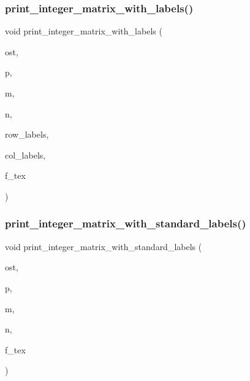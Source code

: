 \mbox{\label{util_8_c_a2bdc89ce87b4a61c848a4859d85c2f30}} 
\subsubsection{\texorpdfstring{print\+\_\+integer\+\_\+matrix\+\_\+with\+\_\+labels()}{print\_integer\_matrix\_with\_labels()}}
{\footnotesize\ttfamily void print\+\_\+integer\+\_\+matrix\+\_\+with\+\_\+labels (\begin{DoxyParamCaption}\item[{ostream \&}]{ost,  }\item[{\mbox{\hyperlink{galois_8h_a09fddde158a3a20bd2dcadb609de11dc}{I\+NT}} $\ast$}]{p,  }\item[{\mbox{\hyperlink{galois_8h_a09fddde158a3a20bd2dcadb609de11dc}{I\+NT}}}]{m,  }\item[{\mbox{\hyperlink{galois_8h_a09fddde158a3a20bd2dcadb609de11dc}{I\+NT}}}]{n,  }\item[{\mbox{\hyperlink{galois_8h_a09fddde158a3a20bd2dcadb609de11dc}{I\+NT}} $\ast$}]{row\+\_\+labels,  }\item[{\mbox{\hyperlink{galois_8h_a09fddde158a3a20bd2dcadb609de11dc}{I\+NT}} $\ast$}]{col\+\_\+labels,  }\item[{\mbox{\hyperlink{galois_8h_a09fddde158a3a20bd2dcadb609de11dc}{I\+NT}}}]{f\+\_\+tex }\end{DoxyParamCaption})}

\mbox{\label{util_8_c_ad39c343d865ff89a5aad3c689280ad09}} 
\subsubsection{\texorpdfstring{print\+\_\+integer\+\_\+matrix\+\_\+with\+\_\+standard\+\_\+labels()}{print\_integer\_matrix\_with\_standard\_labels()}}
{\footnotesize\ttfamily void print\+\_\+integer\+\_\+matrix\+\_\+with\+\_\+standard\+\_\+labels (\begin{DoxyParamCaption}\item[{ostream \&}]{ost,  }\item[{\mbox{\hyperlink{galois_8h_a09fddde158a3a20bd2dcadb609de11dc}{I\+NT}} $\ast$}]{p,  }\item[{\mbox{\hyperlink{galois_8h_a09fddde158a3a20bd2dcadb609de11dc}{I\+NT}}}]{m,  }\item[{\mbox{\hyperlink{galois_8h_a09fddde158a3a20bd2dcadb609de11dc}{I\+NT}}}]{n,  }\item[{\mbox{\hyperlink{galois_8h_a09fddde158a3a20bd2dcadb609de11dc}{I\+NT}}}]{f\+\_\+tex }\end{DoxyParamCaption})}


